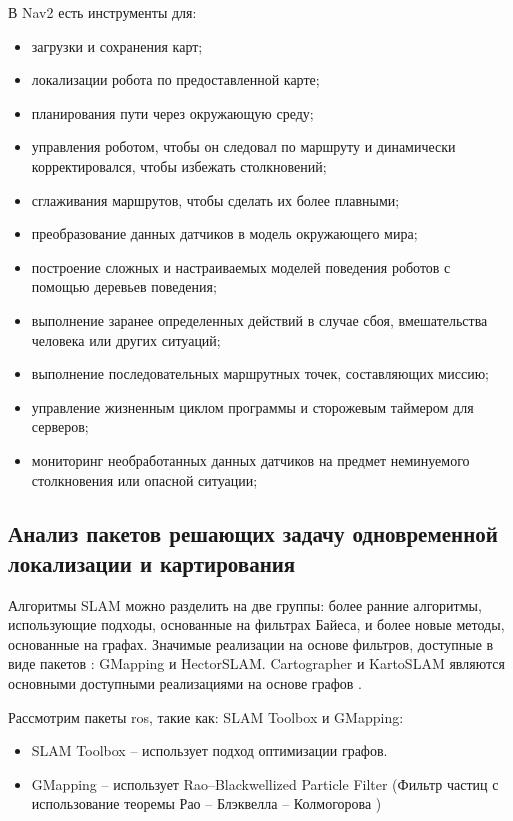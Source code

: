В Nav2 есть инструменты для:
\begin{itemize}
	\item загрузки и сохранения карт;
	\item локализации робота по предоставленной карте;
	\item планирования пути через окружающую среду;
	\item управления роботом, чтобы он следовал по маршруту и динамически
		корректировался, чтобы избежать столкновений;
	\item сглаживания маршрутов, чтобы сделать их более плавными;
	\item преобразование данных датчиков в модель окружающего мира;
	\item построение сложных и настраиваемых моделей поведения роботов с
		помощью деревьев поведения;
	\item выполнение заранее определенных действий в случае сбоя, вмешательства
		человека или других ситуаций;
	\item выполнение последовательных маршрутных точек, составляющих миссию;
	\item управление жизненным циклом программы и сторожевым таймером для
		серверов;
	\item мониторинг необработанных данных датчиков на предмет неминуемого
		столкновения или опасной ситуации;
\end{itemize}

\subsection{Анализ пакетов \ros{} решающих задачу одновременной локализации и
картирования}
\label{sec:ros_analysys}

Алгоритмы SLAM можно разделить на две группы: более ранние алгоритмы,
использующие подходы, основанные на фильтрах Байеса, и более новые методы,
основанные на графах. Значимые реализации на основе фильтров, доступные в виде
пакетов \ros{}: GMapping и HectorSLAM. Cartographer и KartoSLAM являются
основными доступными реализациями на основе графов \cite{macenski2021slam}.

Рассмотрим пакеты ros{}, такие как: SLAM Toolbox и GMapping:
\begin{itemize}
	\item SLAM Toolbox -- использует подход оптимизации
		графов.
	\item GMapping \cite{grisetti2005improving} -- использует Rao–Blackwellized
		Particle Filter (Фильтр частиц с использование теоремы Рао -- Блэквелла --
		Колмогорова )
\end{itemize}

